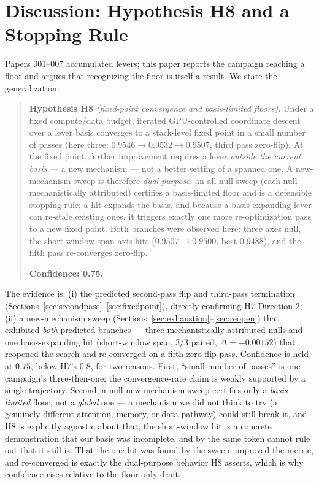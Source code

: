 \documentclass{article}
\begin{document}
\section{Discussion: Hypothesis H8 and a Stopping Rule}
\label{sec:discussion}

Papers 001--007 accumulated levers; this paper reports the campaign reaching a floor and argues that recognizing the floor is itself a result. We state the generalization:

\begin{quote}
\textbf{Hypothesis H8} \emph{(fixed-point convergence and basis-limited floors).} Under a fixed compute/data budget, iterated GPU-controlled coordinate descent over a lever basis converges to a stack-level fixed point in a small number of passes (here three: $0.9546 \rightarrow 0.9532 \rightarrow 0.9507$, third pass zero-flip). At the fixed point, further improvement requires a lever \emph{outside the current basis} --- a new mechanism --- not a better setting of a spanned one. A new-mechanism sweep is therefore \emph{dual-purpose}: an all-null sweep (each null mechanistically attributed) certifies a basis-limited floor and is a defensible stopping rule; a hit expands the basis, and because a basis-expanding lever can re-stale existing ones, it triggers exactly one more re-optimization pass to a new fixed point. Both branches were observed here: three axes null, the short-window-span axis hits ($0.9507 \rightarrow 0.9500$, best $0.9488$), and the fifth pass re-converges zero-flip.

\textbf{Confidence: 0.75.}
\end{quote}

The evidence is: (i) the predicted second-pass flip and third-pass termination (Sections~\ref{sec:secondpass}--\ref{sec:fixedpoint}), directly confirming H7 Direction 2; (ii) a new-mechanism sweep (Sections~\ref{sec:exhaustion}--\ref{sec:reopen}) that exhibited \emph{both} predicted branches --- three mechanistically-attributed nulls and one basis-expanding hit (short-window span, $3/3$ paired, $\Delta=-0.00152$) that reopened the search and re-converged on a fifth zero-flip pass. Confidence is held at $0.75$, below H7's $0.8$, for two reasons. First, ``small number of passes'' is one campaign's three-then-one; the convergence-rate claim is weakly supported by a single trajectory. Second, a null new-mechanism sweep certifies only a \emph{basis-limited} floor, not a \emph{global} one --- a mechanism we did not think to try (a genuinely different attention, memory, or data pathway) could still break it, and H8 is explicitly agnostic about that; the short-window hit is a concrete demonstration that our basis was incomplete, and by the same token cannot rule out that it still is. That the one hit was found by the sweep, improved the metric, and re-converged is exactly the dual-purpose behavior H8 asserts, which is why confidence rises relative to the floor-only draft.
\end{document}
